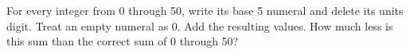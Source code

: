 For every integer from 0 through 50, write its base 5 numeral and delete its units digit. Treat an empty numeral as 0. Add the resulting values. How much less is this sum than the correct sum of 0 through 50?
